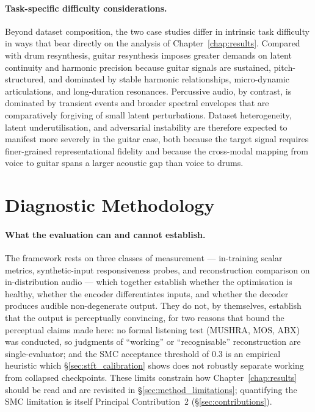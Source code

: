 \documentclass[a4paper,11pt,oneside,openany]{book}
\begin{document}
\paragraph{Task-specific difficulty considerations.} Beyond dataset composition, the two case studies differ in intrinsic task difficulty in ways that bear directly on the analysis of Chapter~\ref{chap:results}. Compared with drum resynthesis, guitar resynthesis imposes greater demands on latent continuity and harmonic precision because guitar signals are sustained, pitch-structured, and dominated by stable harmonic relationships, micro-dynamic articulations, and long-duration resonances. Percussive audio, by contrast, is dominated by transient events and broader spectral envelopes that are comparatively forgiving of small latent perturbations. Dataset heterogeneity, latent underutilisation, and adversarial instability are therefore expected to manifest more severely in the guitar case, both because the target signal requires finer-grained representational fidelity and because the cross-modal mapping from voice to guitar spans a larger acoustic gap than voice to drums.

\section{Diagnostic Methodology}\label{sec:diagnostic_method}

\paragraph{What the evaluation can and cannot establish.} The framework rests on three classes of measurement --- in-training scalar metrics, synthetic-input responsiveness probes, and reconstruction comparison on in-distribution audio --- which together establish whether the optimisation is healthy, whether the encoder differentiates inputs, and whether the decoder produces audible non-degenerate output. They do not, by themselves, establish that the output is perceptually convincing, for two reasons that bound the perceptual claims made here: no formal listening test (MUSHRA, MOS, ABX) was conducted, so judgments of ``working'' or ``recognisable'' reconstruction are single-evaluator; and the SMC acceptance threshold of 0.3 is an empirical heuristic which \S\ref{sec:stft_calibration} shows does not robustly separate working from collapsed checkpoints. These limits constrain how Chapter~\ref{chap:results} should be read and are revisited in \S\ref{sec:method_limitations}; quantifying the SMC limitation is itself Principal Contribution~2 (\S\ref{sec:contributions}).
\end{document}
